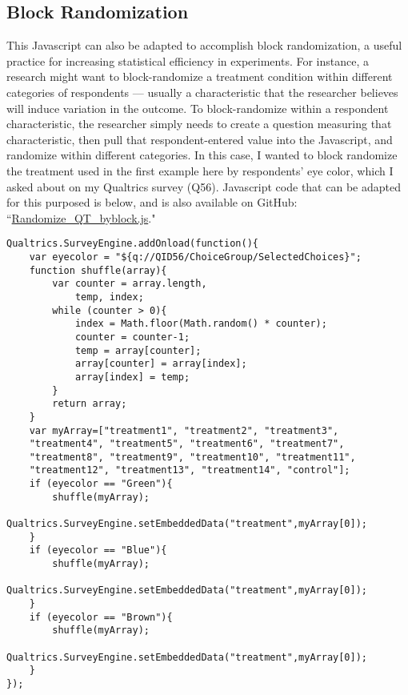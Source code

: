 \documentclass[12pt]{article}
\begin{document}
\subsection{Block Randomization}
This Javascript can also be adapted to accomplish block randomization, a useful practice for increasing statistical efficiency in experiments. For instance, a research might want to block-randomize a treatment condition within different categories of respondents --- usually a characteristic that the researcher believes will induce variation in the outcome. To block-randomize within a respondent characteristic, the researcher simply needs to create a question measuring that characteristic, then pull that respondent-entered value into the Javascript, and randomize within different categories. In this case, I wanted to block randomize the treatment used in the first example here by respondents' eye color, which I asked about on my Qualtrics survey (Q56). Javascript code that can be adapted for this purposed is below, and is also available on GitHub: ``\href{https://github.com/justindbk/qualtrics-javascript}{Randomize\_QT\_byblock.js}."

\begin{verbatim}
Qualtrics.SurveyEngine.addOnload(function(){
	var eyecolor = "${q://QID56/ChoiceGroup/SelectedChoices}";
	function shuffle(array){
		var counter = array.length,
			temp, index;
		while (counter > 0){
			index = Math.floor(Math.random() * counter);
			counter = counter-1;
			temp = array[counter];
			array[counter] = array[index];
			array[index] = temp;
		}
		return array;
	}
	var myArray=["treatment1", "treatment2", "treatment3", 
	"treatment4", "treatment5", "treatment6", "treatment7", 
	"treatment8", "treatment9", "treatment10", "treatment11", 
	"treatment12", "treatment13", "treatment14", "control"];
	if (eyecolor == "Green"){
		shuffle(myArray);
		Qualtrics.SurveyEngine.setEmbeddedData("treatment",myArray[0]);
	}
	if (eyecolor == "Blue"){
		shuffle(myArray);
		Qualtrics.SurveyEngine.setEmbeddedData("treatment",myArray[0]);
	}
	if (eyecolor == "Brown"){
		shuffle(myArray);
		Qualtrics.SurveyEngine.setEmbeddedData("treatment",myArray[0]);
	}
});
\end{verbatim}
\end{document}
